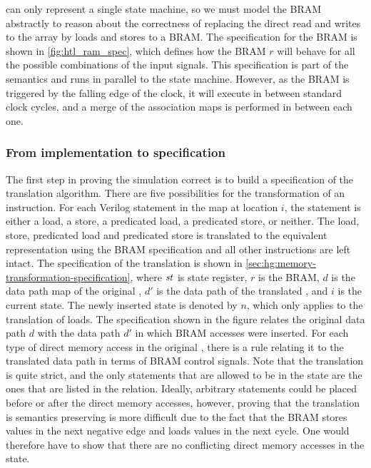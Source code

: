 \htl{} can only represent a single state machine, so we must model the
\gls{BRAM} abstractly to reason about the correctness of replacing the direct
read and writes to the array by loads and stores to a \gls{BRAM}.  The
specification for the \gls{BRAM} is shown in \cref{fig:htl_ram_spec}, which
defines how the \gls{BRAM} $r$ will behave for all the possible combinations of
the input signals.  This specification is part of the \htl{} semantics and runs
in parallel to the state machine.  However, as the \gls{BRAM} is triggered by
the falling edge of the clock, it will execute in between standard clock cycles,
and a merge of the association maps is performed in between each one.

\subsubsection{From implementation to specification}

The first step in proving the simulation correct is to build a specification of
the translation algorithm.  There are five possibilities for the transformation
of an instruction. For each Verilog statement in the map at location $i$, the
statement is either a load, a store, a predicated load, a predicated store, or
neither. The load, store, predicated load and predicated store is translated to
the equivalent representation using the \gls{BRAM} specification and all other
instructions are left intact.  The specification of the translation is shown in
\cref{sec:hg:memory-transformation-specification}, where $\mathit{st}$ is state
register, $r$ is the \gls{BRAM}, $d$ is the data path map of the original
\htl{}, $d'$ is the data path of the translated \htl{}, and $i$ is the current
state.  The newly inserted state is denoted by $n$, which only applies to the
translation of loads.  The specification shown in the figure relates the
original \htl{} data path $d$ with the data path $d'$ in which \gls{BRAM}
accesses were inserted.  For each type of direct memory access in the original
\htl{}, there is a rule relating it to the translated data path in terms of
\gls{BRAM} control signals.  Note that the translation is quite strict, and the
only statements that are allowed to be in the \htl{} state are the ones that are
listed in the relation.  Ideally, arbitrary statements could be placed before or
after the direct memory accesses, however, proving that the translation is
semantics preserving is more difficult due to the fact that the \gls{BRAM}
stores values in the next negative edge and loads values in the next cycle.  One
would therefore have to show that there are no conflicting direct memory
accesses in the state.

